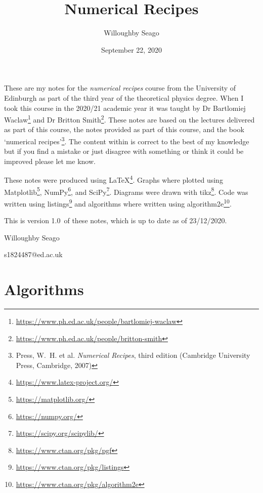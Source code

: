 \documentclass[a4paper]{article}
\author{Willoughby Seago}
\date{September 22, 2020}
\title{Numerical Recipes}
\newcommand{\notesVersion}{1.0}
\newcommand{\notesDate}{23/12/2020}
\begin{document}
    \maketitle
    These are my notes for the \textit{numerical recipes} course from the University of Edinburgh as part of the third year of the theoretical physics degree.
    When I took this course in the 2020/21 academic year it was taught by Dr Bartlomiej Waclaw\footnote{\url{https://www.ph.ed.ac.uk/people/bartlomiej-waclaw}} and Dr Britton Smith\footnote{\url{https://www.ph.ed.ac.uk/people/britton-smith}}.
    These notes are based on the lectures delivered as part of this course, the notes provided as part of this course, and the book `numerical recipes'\footnote{Press, W.~H. et al. \textit{Numerical Recipes}, third edition (Cambridge University Press, Cambridge, 2007)}.
    The content within is correct to the best of my knowledge but if you find a mistake or just disagree with something or think it could be improved please let me know.
    
    These notes were produced using \LaTeX\footnote{\url{https://www.latex-project.org/}}.
    Graphs where plotted using Matplotlib\footnote{\url{https://matplotlib.org/}}, NumPy\footnote{\url{https://numpy.org/}}, and SciPy\footnote{\url{https://scipy.org/scipylib/}}.
    Diagrams were drawn with tikz\footnote{\url{https://www.ctan.org/pkg/pgf}}.
    Code was written using listings\footnote{\url{https://www.ctan.org/pkg/listings}} and algorithms where written using algorithm2e\footnote{\url{https://www.ctan.org/pkg/algorithm2e}}.
    
    This is version \notesVersion~of these notes, which is up to date as of \notesDate.
    \begin{flushright}
        Willoughby Seago
        
        s1824487@ed.ac.uk
    \end{flushright}
    \clearpage
    \tableofcontents
    \listoffigures
    \listoftables
    \listofalgorithms
    \printglossary[type=\acronymtype, title=Acronyms, style=long]
    \clearpage
    \begingroup
    \let\clearpage\relax  %
    \endgroup
    \section{Algorithms}
\end{document}
